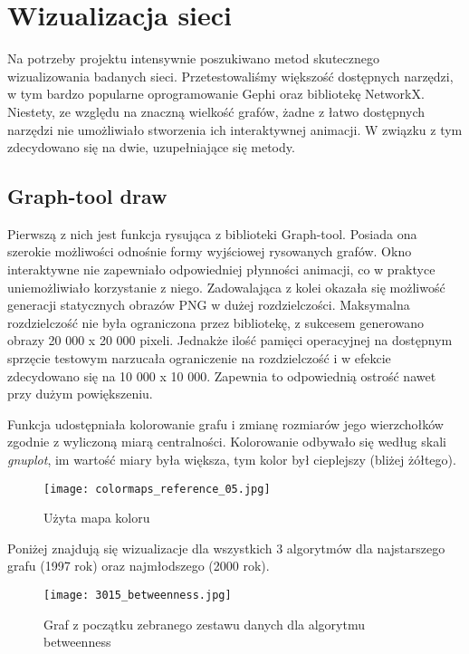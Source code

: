 \chapter{Wizualizacja sieci}

Na potrzeby projektu intensywnie poszukiwano metod skutecznego wizualizowania badanych sieci. Przetestowaliśmy większość dostępnych narzędzi, w tym bardzo popularne oprogramowanie Gephi oraz bibliotekę NetworkX. Niestety, ze względu na znaczną wielkość grafów, żadne z łatwo dostępnych narzędzi nie umożliwiało stworzenia ich interaktywnej animacji. W związku z tym zdecydowano się na dwie, uzupełniające się metody.

\section{Graph-tool draw}

Pierwszą z nich jest funkcja rysująca z biblioteki Graph-tool. Posiada ona szerokie możliwości odnośnie formy wyjściowej rysowanych grafów. Okno interaktywne nie zapewniało odpowiedniej płynności animacji, co w praktyce uniemożliwiało korzystanie z niego. Zadowalająca z kolei okazała się możliwość generacji statycznych obrazów PNG w dużej rozdzielczości. Maksymalna rozdzielczość nie była ograniczona przez bibliotekę, z sukcesem generowano obrazy 20 000 x 20 000 pixeli. Jednakże ilość pamięci operacyjnej na dostępnym sprzęcie testowym narzucała ograniczenie na rozdzielczość i w efekcie zdecydowano się na 10 000 x 10 000. Zapewnia to odpowiednią ostrość nawet przy dużym powiększeniu.
 
Funkcja udostępniała kolorowanie grafu i zmianę rozmiarów jego wierzchołków zgodnie z wyliczoną miarą centralności. Kolorowanie odbywało się według skali \textit{gnuplot}, im wartość miary była większa, tym kolor był cieplejszy (bliżej żółtego).

\FloatBarrier\FloatBarrier
\begin{figure}[h]
	\centering
	\texttt{[image: colormaps\_reference\_05.jpg]}
	\caption{Użyta mapa koloru}
\end{figure}
\FloatBarrier\FloatBarrier

Poniżej znajdują się wizualizacje dla wszystkich 3 algorytmów dla najstarszego grafu (1997 rok) oraz najmłodszego (2000 rok).

\FloatBarrier\FloatBarrier
\begin{figure}[h]
	\centering
	\texttt{[image: 3015\_betweenness.jpg]}
	\caption{Graf z początku zebranego zestawu danych dla algorytmu betweenness}
\end{figure}
\FloatBarrier\FloatBarrier

